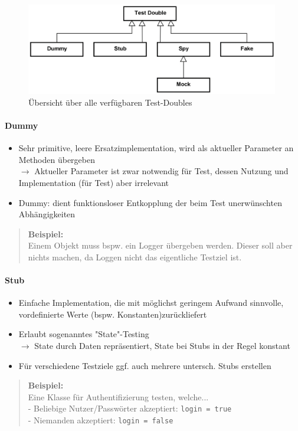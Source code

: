 \documentclass[a4paper]{article}
\begin{document}
			\begin{figure}[!htb]
				\centering
				\includegraphics[keepaspectratio, height=4cm]{img/testing/doubles.png}
				\caption{Übersicht über alle verfügbaren Test-Doubles}
				\label{fig:doubles}
			\end{figure}
		
			\paragraph{Dummy}
			
				\begin{itemize}
					\item Sehr primitive, leere Ersatzimplementation, wird als aktueller Parameter an Methoden übergeben\\
					$\rightarrow$ Aktueller Parameter ist zwar notwendig für Test, dessen Nutzung und Implementation (für Test) aber irrelevant
					\item Dummy: dient funktionsloser Entkopplung der beim Test unerwünschten Abhängigkeiten
				\end{itemize}
				\begin{quote}
					\textbf{Beispiel:}\\
					Einem Objekt muss bspw. ein Logger übergeben werden.
					Dieser soll aber nichts machen, da Loggen nicht das eigentliche Testziel ist.
				\end{quote}
		
			\paragraph{Stub}
			
				\begin{itemize}
					\item Einfache Implementation, die mit möglichst geringem Aufwand sinnvolle, vordefinierte Werte (bspw. Konstanten)zurückliefert
					\item Erlaubt sogenanntes "State"-Testing\\
						$\rightarrow$ State durch Daten repräsentiert, State bei Stubs in der Regel konstant
					\item Für verschiedene Testziele ggf. auch mehrere untersch. Stubs erstellen
				\end{itemize}
				\begin{quote}
					\textbf{Beispiel:}\\
					Eine Klasse für Authentifizierung testen, welche...\\
					- Beliebige Nutzer/Passwörter akzeptiert: \texttt{login = true}\\
					- Niemanden akzeptiert: \texttt{login = false}
				\end{quote}
			
\end{document}
